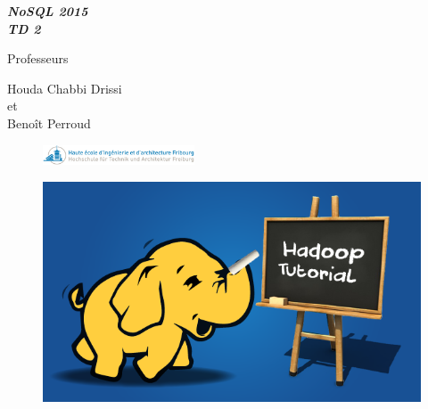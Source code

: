 \documentclass[11pt]{article}
\begin{document}

\begin{center}
\Huge{\bf \emph{NoSQL 2015 \\ TD 2}} %
\end{center}

\begin{center}
Professeurs 

\bigskip 


Houda Chabbi Drissi \\et \\Benoît Perroud \\
\end{center}

\begin{center}
\begin{figure}[h!]

  \centering
    \includegraphics[width=0.4\textwidth]{Images/Logo_HEIA-FR_site}
     
\end{figure}
\end{center}



\begin{figure}[h!]

  \centering
    \includegraphics[width=1\textwidth]{Images/Hadoop-tutorial.png}
     
\end{figure}

\bigskip
\end{document}
